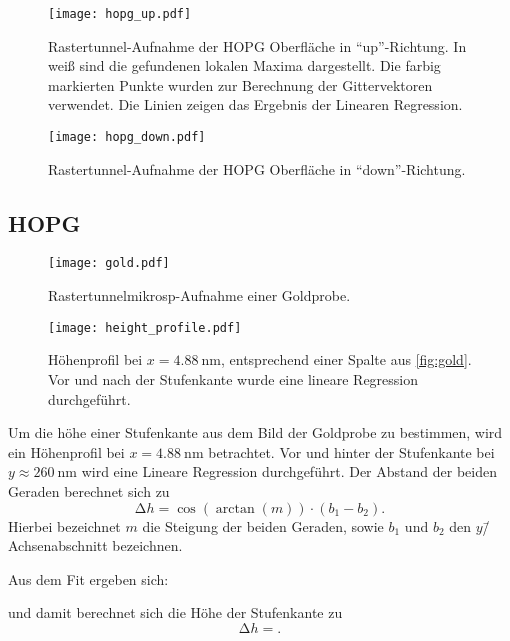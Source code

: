 \begin{figure}
  \centering
  \texttt{[image: hopg\_up.pdf]}
  \caption{%
    Rastertunnel-Aufnahme der HOPG Oberfläche in \enquote{up}-Richtung.
    In weiß sind die gefundenen lokalen Maxima dargestellt. Die farbig markierten Punkte wurden zur Berechnung der Gittervektoren verwendet.
    Die Linien zeigen das Ergebnis der Linearen Regression.
  }\label{fig:hopg_up}
\end{figure}

\begin{figure}
  \centering
  \texttt{[image: hopg\_down.pdf]}
  \caption{%
    Rastertunnel-Aufnahme der HOPG Oberfläche in \enquote{down}-Richtung.
  }\label{fig:hopg_down}
\end{figure}

\subsection{HOPG}

\begin{figure}
  \centering
  \texttt{[image: gold.pdf]}
  \caption{Rastertunnelmikrosp-Aufnahme einer Goldprobe.}
  \label{fig:gold}
\end{figure}


\begin{figure}
  \centering
  \texttt{[image: height\_profile.pdf]}
  \caption{Höhenprofil bei $x=\SI{4.88}{\nano\meter}$, entsprechend einer Spalte aus \autoref{fig:gold}. Vor und nach der Stufenkante wurde eine lineare Regression durchgeführt.}
  \label{fig:profile}
\end{figure}

Um die höhe einer Stufenkante aus dem Bild der Goldprobe zu bestimmen, wird ein Höhenprofil bei $x=\SI{4.88}{\nano\meter}$ betrachtet.
Vor und hinter der Stufenkante bei  $y \approx \SI{260}{\nano\meter}$ wird eine Lineare Regression durchgeführt.
Der Abstand der beiden Geraden berechnet sich zu
\begin{equation}
  \increment h = \cos(\arctan(m)) \cdot (b_1 - b_2).
\end{equation}
Hierbei bezeichnet $m$ die Steigung der beiden Geraden, sowie $b_1$ und $b_2$ den $y$\=/Achsenabschnitt bezeichnen.

Aus dem Fit ergeben sich:

und damit berechnet sich die Höhe der Stufenkante zu
\begin{equation}
  \increment h = .
\end{equation}

